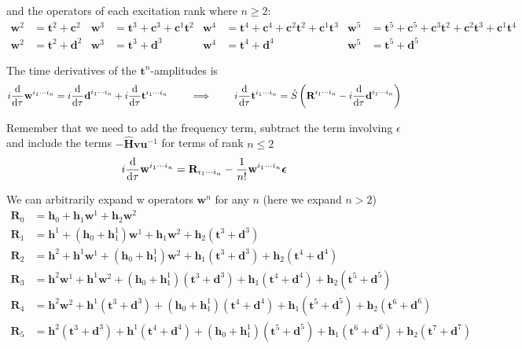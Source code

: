 \documentclass{article}
\newcommand{\bh}{\textbf{h}}
\newcommand{\bt}{\textbf{t}}
\newcommand{\bw}{\textbf{w}}
\newcommand{\bc}{\textbf{c}}
\newcommand{\bd}{\textbf{d}}
\begin{document}
and the operators of each excitation rank where $n \geq 2$:
\begin{align}
\bw^{2} &= \bt^{2} + \bc^{2} & \bw^{3} &= \bt^{3} + \bc^{3} + \bc^{1}\bt^{2} & \bw^{4} &= \bt^{4} + \bc^{4} + \bc^{2}\bt^{2} + \bc^{1}\bt^{3} & \bw^{5} &= \bt^{5} + \bc^{5} + \bc^{3}\bt^{2} + \bc^{2}\bt^{3} + \bc^{1}\bt^{4} &  \\
\bw^{2} &= \bt^{2} + \textbf{d}^{2} & \bw^{3} &= \bt^{3} + \textbf{d}^{3} & \bw^{4} &= \bt^{4} + \textbf{d}^{4} & \bw^{5} &= \bt^{5} + \textbf{d}^{5} &
\end{align}

The time derivatives of the $\bt^{n}$-amplitudes is
\begin{equation}
    i\dv{\tau}\bw^{i_1 \cdots i_n} =
    i\dv{\tau}\textbf{d}^{i_1 \cdots i_n} + i\dv{\tau}\bt^{i_1 \cdots i_n}
\qquad \implies \qquad
    i\dv{\tau}\bt^{i_1 \cdots i_n} =
    \hat{S}\left(\textbf{R}^{i_1 \cdots i_n} - i\dv{\tau}\textbf{d}^{i_1 \cdots i_n}\right)
\end{equation}

Remember that we need to add the frequency term, subtract the term involving $\epsilon$ and include the terms $-\hat{\textbf{H}}\textbf{v}\textbf{u}^{-1}$ for terms of rank $n \leq 2$
\begin{equation}
    i\dv{\tau}\bw^{i_1 \cdots i_n} = \textbf{R}_{i_1 \cdots i_n} - \dfrac{1}{n!}\bw^{i_1 \cdots i_n}\boldsymbol\epsilon
\end{equation}

We can arbitrarily expand w operators $\bw^n$ for any $n$ (here we expand $n > 2$)
\begin{align} %
\textbf{R}_{0} &= \bh_0 + \bh_1\bw^{1} + \bh_2\bw^{2} \\
%
\textbf{R}_{1} &= \bh^1 + (\bh_0 + \bh^1_1)\bw^{1} + \bh_1\bw^{2} + \bh_2(\bt^{3} + \bd^{3}) \\
%
\textbf{R}_{2} &= \bh^2 + \bh^1\bw^{1} + (\bh_0 + \bh^1_1)\bw^{2} + \bh_1(\bt^{3} + \bd^{3}) + \bh_2(\bt^{4} + \bd^{4}) \\
%
\textbf{R}_{3} &= \bh^2\bw^{1} + \bh^1\bw^{2} + (\bh_0 + \bh^1_1)(\bt^{3} + \bd^{3}) + \bh_1(\bt^{4} + \bd^{4}) + \bh_2(\bt^{5} + \bd^{5}) \\
%
\textbf{R}_{4} &= \bh^2\bw^{2} + \bh^1(\bt^{3} + \bd^{3}) + (\bh_0 + \bh^1_1)(\bt^{4} + \bd^{4}) + \bh_1(\bt^{5} + \bd^{5}) + \bh_2(\bt^{6} + \bd^{6}) \\
%
\textbf{R}_{5} &= \bh^2(\bt^{3} + \bd^{3}) + \bh^1(\bt^{4} + \bd^{4}) + (\bh_0 + \bh^1_1)(\bt^{5} + \bd^{5}) + \bh_1(\bt^{6} + \bd^{6}) + \bh_2(\bt^{7} + \bd^{7})
\end{align}
\end{document}
